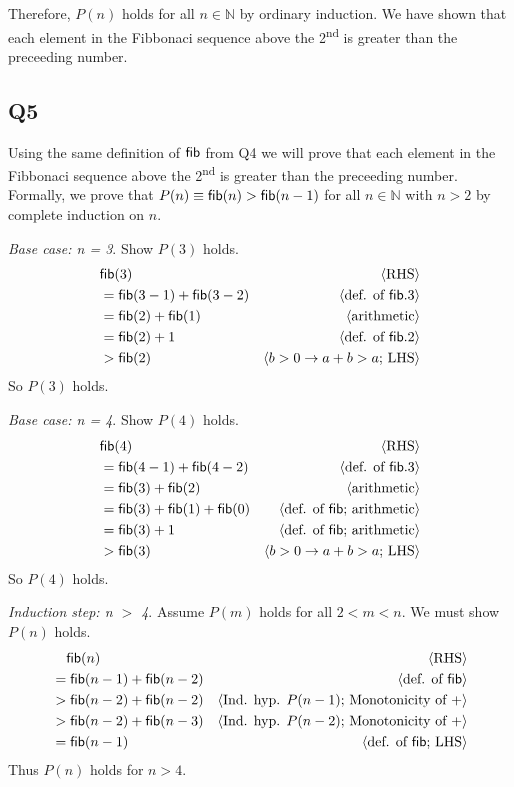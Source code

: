 \documentclass[12pt, fleqn]{article}
\newcommand{\pnote}[1]{{\langle \text{#1} \rangle}}
\newcommand{\mname}[1]{\mbox{\sf #1}}
\begin{document}
\medskip

Therefore, $P(n)$ holds for all $n \in \mathbb{N}$ by ordinary induction. We have shown that each element in the 
Fibbonaci sequence above the 2\textsuperscript{nd} is greater than the preceeding number.

\subsection{Q5}

Using the same definition of $\mname{fib}$ from Q4 we will prove that each element in the Fibbonaci sequence above the 2\textsuperscript{nd} is
greater than the preceeding number. Formally, we prove that $P(n) \equiv \mname{fib}(n) > \mname{fib}(n - 1)$
for all $n \in \mathbb{N}$ with $n > 2$ by complete induction on $n$.

\emph{Base case: n = 3}. Show $P(3)$ holds.
\begin{align*}
    & \mname{fib}(3) & \pnote{RHS} \\
    &= \mname{fib}(3 - 1) + \mname{fib}(3 - 2) &  \pnote{def. of $\mname{fib}.3$} \\
    &= \mname{fib}(2) + \mname{fib}(1) & \pnote{arithmetic} \\
    &= \mname{fib}(2) + 1 & \pnote{def. of $\mname{fib}.2$} \\
    &> \mname{fib}(2) & \pnote{$b > 0 \rightarrow a + b > a$; LHS}
\end{align*}
So $P(3)$ holds.

\medskip

\emph{Base case: n = 4}. Show $P(4)$ holds.
\begin{align*}
    & \mname{fib}(4) & \pnote{RHS} \\
    &= \mname{fib}(4 - 1) + \mname{fib}(4 - 2) &  \pnote{def. of $\mname{fib}.3$} \\
    &= \mname{fib}(3) + \mname{fib}(2) & \pnote{arithmetic} \\
    &= \mname{fib}(3) + \mname{fib}(1) + \mname{fib}(0) & \pnote{def. of $\mname{fib}$; arithmetic} \\
    &= \mname{fib}(3) + 1 & \pnote{def. of $\mname{fib}$; arithmetic} \\
    &> \mname{fib}(3) & \pnote{$b > 0 \rightarrow a + b > a$; LHS}
\end{align*}
So $P(4)$ holds.

\medskip

\emph{Induction step: n $>$ 4}. Assume $P(m)$ holds for all $2 < m < n$. We must show $P(n)$ holds.
\begin{align*}
    &\phantom{{}=} \mname{fib}(n) & \pnote{RHS} \\
    &= \mname{fib}(n - 1) + \mname{fib}(n - 2) &  \pnote{def. of $\mname{fib}$} \\
    &> \mname{fib}(n - 2) + \mname{fib}(n - 2) & \pnote{Ind. hyp. $P(n - 1)$; Monotonicity of +} \\
    &> \mname{fib}(n - 2) + \mname{fib}(n - 3) & \pnote{Ind. hyp. $P(n - 2)$; Monotonicity of +} \\
    &= \mname{fib}(n - 1) & \pnote{def. of \mname{fib}; LHS}
\end{align*}
Thus $P(n)$ holds for $n > 4$.
\end{document}
